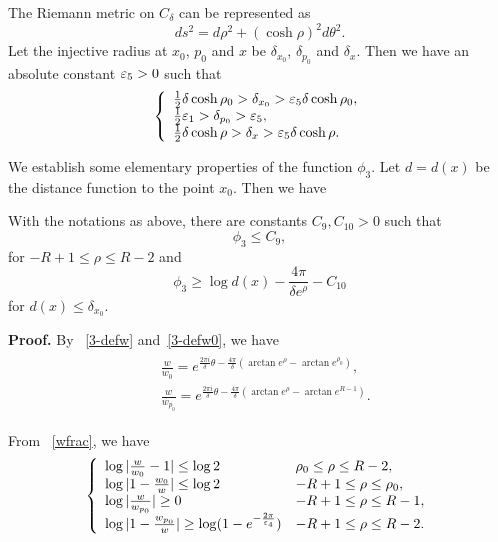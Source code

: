 The Riemann metric on $C_\delta$ can be represented as
\begin{equation}\label{rie}
ds^2=d\rho^2+(\cosh\rho)^2 d\theta^2.
\end{equation}
Let the injective radius at $x_0$, $p_0$ and $x$ be
$\delta_{x_0}$, $\delta_{p_0}$ and $\delta_x$. Then we have an
absolute
constant $\varepsilon_5>0$ such that
\begin{equation}\label{ddelta}
\left\{
\begin{array}{l}
\frac 12\delta\cosh\rho_0>\delta_{x_0}>\varepsilon_5\delta\cosh\rho_0,\\
\frac 12\varepsilon_1>\delta_{p_0}>\varepsilon_5,\\
\frac 12\delta\cosh\rho>\delta_x>\varepsilon_5\delta\cosh\rho.
\end{array}
\right.
\end{equation}

We establish some elementary properties of the function
$\phi_3$. 
Let $d=d(x)$ be the distance function to the point $x_0$. Then we have


\begin{lemma}\label{4-lem31}
With the notations as above,
there are constants $C_9, C_{10}>0$ such that
\begin{equation}\label{3-phi3}
\phi_3\leq C_9,
\end{equation}
for $-R+1\leq\rho\leq R-2$
and 
\begin{equation}\label{3-phi31}
\phi_3\geq\log d(x)-\frac{4\pi}{\delta e^\rho}-C_{10}
\end{equation}
for $d(x)\leq\delta_{x_0}$.
\end{lemma}

{\bf Proof.} By ~\eqref{3-defw} and~\eqref{3-defw0}, we have
\begin{align}\label{wfrac}
\begin{split}
&\frac{w}{w_0}=e^{\frac{2\pi i}{\delta}\theta-\frac{4\pi}{\delta}
(\arctan e^\rho-\arctan e^{\rho_0})},\\
&\frac{w}{w_{p_0}}=e^{\frac{2\pi i}{\delta}\theta-\frac{4\pi}{\delta}
(\arctan e^\rho-\arctan e^{R-1})}.
\end{split}
\end{align}

From ~\eqref{wfrac},
we have
\begin{align}\label{basic}
\left\{
\begin{array}{ll}
 \log |\frac{w}{w_0}-1|\leq\log 2&\rho_0\leq\rho\leq R-2,\\
\log|1-\frac{w_0}{w}|\leq\log 2 &-R+1\leq\rho\leq\rho_0,\\
\log |\frac{w}{w_{p_0}}|\geq 0& -R+1\leq\rho\leq R-1,\\
 \log|1-\frac{w_{p_0}}{w}|
\geq\log(1-e^{-\frac{2\pi}{\varepsilon_4}})&
-R+1\leq\rho\leq R-2.
\end{array}
\right.
\end{align}

